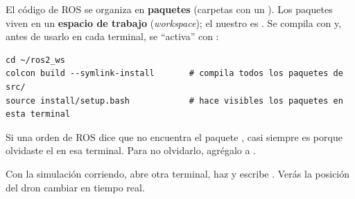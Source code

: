 El código de ROS se organiza en \textbf{paquetes} (carpetas con un ). Los paquetes
viven en un \textbf{espacio de trabajo} (\emph{workspace}); el nuestro es . Se
compila con  y, antes de usarlo en cada terminal, se ``activa'' con :

\begin{lstlisting}[style=bash]
cd ~/ros2_ws
colcon build --symlink-install       # compila todos los paquetes de src/
source install/setup.bash            # hace visibles los paquetes en esta terminal
\end{lstlisting}

\begin{aviso}
Si una orden de ROS dice que no encuentra el paquete , casi siempre es porque
olvidaste el  en esa terminal. Para no olvidarlo, agrégalo a
.
\end{aviso}

\begin{ejercicio}
Con la simulación corriendo, abre otra terminal, haz  y escribe
. Verás la posición del dron
cambiar en tiempo real.
\end{ejercicio}
